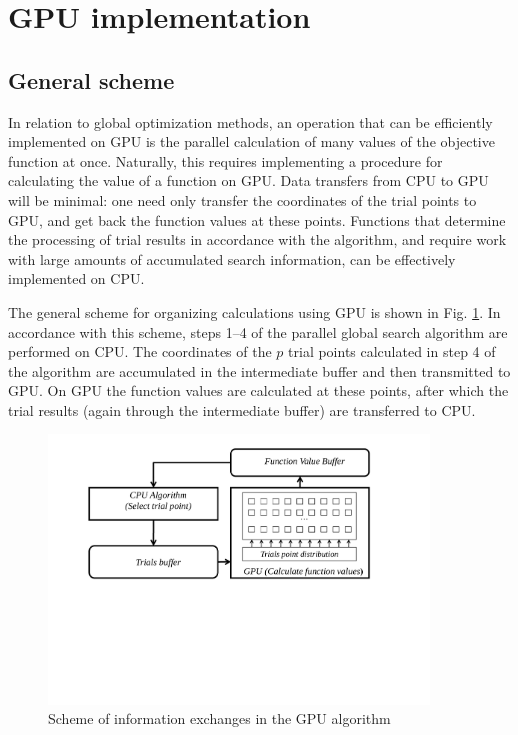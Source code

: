 \documentclass{svproc}
\begin{document}
\section{GPU implementation}

\subsection{General scheme}

In relation to global optimization methods, an operation that can be efficiently implemented on GPU is the parallel calculation of many values of the objective function at once. Naturally, this requires implementing a procedure for calculating the value of a function on GPU. Data transfers from CPU to GPU will be minimal: one need only transfer the coordinates of the trial points to GPU, and get back the function values at these points. Functions that determine the processing of trial results in accordance with the algorithm, and require work with large amounts of accumulated search information, can be effectively implemented on CPU.

The general scheme for organizing calculations using GPU is shown in Fig. \ref{fig:GPU_Algorithm}. In accordance with this scheme, steps 1--4 of the parallel global search algorithm are performed on CPU. The coordinates of the $p$ trial points calculated in step 4 of the algorithm are accumulated in the intermediate buffer and then transmitted to GPU. On GPU the function values are calculated at these points, after which the trial results (again through the intermediate buffer) are transferred to CPU.
   
   \begin{figure}[h!]
    \centering
		\includegraphics[width=0.9\textwidth]{GPU_Algorithm.pdf}
		\caption{Scheme of information exchanges in the GPU algorithm}\label{fig:GPU_Algorithm}
\end{figure}
\end{document}
